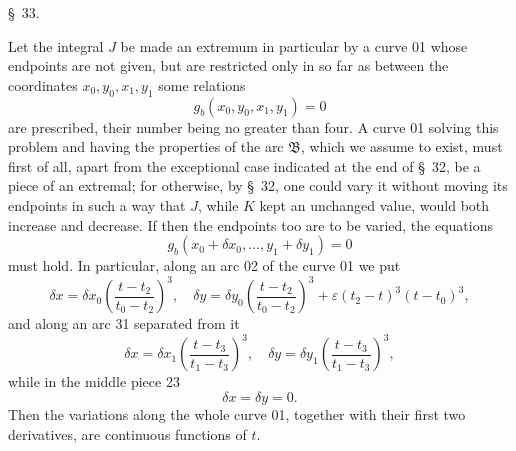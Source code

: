 \documentclass[11pt,a4paper,leqno]{article}
\begin{document}
\begin{center}{\large \S~33.}\end{center}

Let the integral $J$ be made an extremum in particular by a curve 01 whose endpoints are not given, but are restricted only in so far as between the coordinates $x_0,y_0,x_1,y_1$ some relations
\[
g_b(x_0,y_0,x_1,y_1)=0
\]
are prescribed, their number being no greater than four. A curve 01 solving this problem and having the properties of the arc $\mathfrak{B}$, which we assume to exist, must first of all, apart from the exceptional case indicated at the end of \S~32, be a piece of an extremal; for otherwise, by \S~32, one could vary it without moving its endpoints in such a way that $J$, while $K$ kept an unchanged value, would both increase and decrease. If then the endpoints too are to be varied, the equations
\begin{equation}\tag{3}
g_b(x_0+\delta x_0,\ldots,y_1+\delta y_1)=0
\end{equation}
must hold. In particular, along an arc 02 of the curve 01 we put
\[
\delta x=\delta x_0\left(\frac{t-t_2}{t_0-t_2}\right)^3,
\quad
\delta y=\delta y_0\left(\frac{t-t_2}{t_0-t_2}\right)^3
+\varepsilon(t_2-t)^3(t-t_0)^3,
\]
and along an arc 31 separated from it
\[
\delta x=\delta x_1\left(\frac{t-t_3}{t_1-t_3}\right)^3,
\quad
\delta y=\delta y_1\left(\frac{t-t_3}{t_1-t_3}\right)^3,
\]
while in the middle piece 23
\[
\delta x=\delta y=0.
\]
Then the variations along the whole curve 01, together with their first two derivatives, are continuous functions of $t$.
\end{document}
